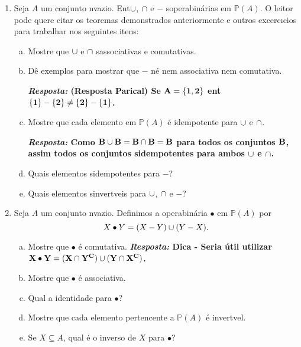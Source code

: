 \begin{enumerate}[{\bf 1.}]
\begin{enumerate}[a)]
{\bf{\it Resposta:} Dica - Sejam ${\bf x^{\ast}}$ e ${\bf y^{\ast}}$ os inversos de ${\bf x}$ e ${\bf y}$ e compute ${\bf y^{\ast}\bullet x^{\ast}\bullet x\bullet y}$.}
\end{enumerate}

\item Seja $A$ um conjunto n\ao vazio. Ent\ao $\cup$, $\cap$ e $-$ s\ao opera\coes bin\'arias em $\mathbb{P}(A)$. O leitor pode quere citar os teoremas demonstrados anteriormente e outros excerc\i cios para trabalhar nos seguintes itens:
\begin{enumerate}[a)]
\item Mostre que $\cup$ e $\cap$ s\ao associativas e comutativas.
\item D\^e exemplos para mostrar que $-$ n\ao \'e nem associativa nem comutativa.

{\bf{\it Resposta:} (Resposta Parical) Se ${\bf A=\{1,2\}}$ ent\ao ${\bf \{1\}-\{2\}\neq\{2\}-\{1\}}$.}

\item Mostre que cada elemento em $\mathbb{P}(A)$ \'e idempotente para $\cup$ e $\cap$.

{\bf{\it Resposta:} Como ${\bf B\cup B=B\cap B=B}$ para todos os conjuntos ${\bf B}$, assim todos os conjuntos s\ao idempotentes para ambos ${\bf \cup}$ e ${\bf \cap}$.}

\item Quais elementos s\ao idempotentes para $-$?
\item Quais elementos s\ao invert\ih veis para $\cup$, $\cap$ e $-$?
\end{enumerate}

\item Seja $A$ um conjunto n\ao vazio. Definimos a opera\cao bin\'aria $\bullet$ em $\mathbb{P}(A)$ por
\[
X\bullet Y=(X-Y)\cup(Y-X).
\]
\begin{enumerate}[a)]
\item Mostre que $\bullet$ \'e comutativa. {\bf{\it Resposta:} Dica - Seria \'util utilizar ${\bf X\bullet Y = (X\cap Y^C)\cup(Y\cap X^C)}$.}
\item Mostre que $\bullet$ \'e associativa.
\item Qual a identidade para $\bullet$?
\item Mostre que cada elemento pertencente a $\mathbb{P}(A)$ \'e invert\ih vel.
\item Se $X\subseteq A$, qual \'e o inverso de $X$ para $\bullet$? 
\end{enumerate}


\end{enumerate}
